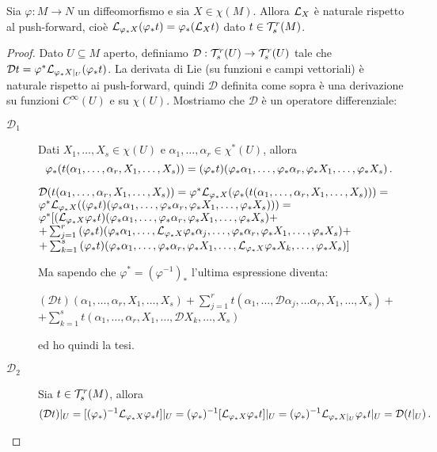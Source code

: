 \begin{proposition}
	Sia $\varphi: M \to N$ un diffeomorfismo e sia $X\in\chi(M)$. Allora $\mathcal L_X$ è naturale rispetto al push-forward, cioè $\mathcal L_{\varphi_*X} (\varphi_*t) = \varphi_*(\mathcal L_Xt)$ dato $t\in\mathcal T_s^r(M)$.
\end{proposition}
\begin{proof}
	Dato $U\subseteq M$ aperto, definiamo $\mathcal D: \mathcal T_s^r(U) \to \mathcal T_s^r(U)$ tale che $\mathcal Dt = \varphi^*\mathcal L_{\varphi_*X|_ U}(\varphi_*t)$.
	La derivata di Lie (su funzioni e campi vettoriali) è naturale rispetto ai push-forward, quindi $\mathcal D$ definita come sopra è una derivazione su funzioni $C^\infty(U)$ e su $\chi(U)$.
	Mostriamo che $\mathcal D$ è un operatore differenziale:
	\begin{description}
	 \item [$\mathcal D_1$]

	Dati $X_1,\ldots,X_s\in\chi(U)$ e $\alpha_1,\ldots,\alpha_r\in\chi^*(U)$, allora
	\begin{equation*}
	\varphi_*(t(\alpha_1,\ldots,\alpha_r,X_1,\ldots,X_s) )= (\varphi_*t)(\varphi_*\alpha_1,\ldots,\varphi_*\alpha_r,\varphi_*X_1,\ldots,\varphi_*X_s)\, \text{. }
	\end{equation*}
	
	  $  \mathcal D(t(\alpha_1,\ldots,\alpha_r,X_1,\ldots,X_s)) = \varphi^*\mathcal L_{\varphi_*X}(\varphi_*(t(\alpha_1,\ldots,\alpha_r,X_1,\ldots,X_s))) = $
	  $  \varphi^*\mathcal L_{\varphi_*X}((\varphi_*t)(\varphi_*\alpha_1,\ldots,\varphi_*\alpha_r,\varphi_*X_1,\ldots,\varphi_*X_s))) = $ \\
	  $  \varphi^*[(\mathcal L_{\varphi_*X}\varphi_*t)(\varphi_*\alpha_1,\ldots,\varphi_*\alpha_r,\varphi_*X_1,\ldots,\varphi_*X_s) + $ \\
	  $  +\sum_{j=1}^r{(\varphi_*t)(\varphi_*\alpha_1,\ldots,\mathcal L_{\varphi_*X}\varphi_*\alpha_j,\ldots,\varphi_*\alpha_r,\varphi_*X_1,\ldots,\varphi_*X_s)} +$ \\
	  $  +\sum_{k=1}^s{(\varphi_*t)(\varphi_*\alpha_1,\ldots,\varphi_*\alpha_r,\varphi_*X_1,\ldots,\mathcal L_{\varphi_*X}\varphi_*X_k,\ldots,\varphi_*X_s)}] $
	
	Ma sapendo che $\varphi^*=(\varphi^{-1})_*$ l'ultima espressione diventa:
	
	  $ (\mathcal D t)(\alpha_1,\ldots,\alpha_r,X_1,\ldots,X_s)+\sum_{j=1}^r{t(\alpha_1,\ldots,\mathcal D \alpha_j, \ldots \alpha_r,X_1,\ldots,X_s)} +$\\
	  $ +\sum_{k=1}^s{t(\alpha_1,\ldots, \alpha_r,X_1,\ldots,\mathcal D X_k, \ldots,X_s)}$
	 
	 ed ho quindi la tesi.
	
	\item [$\mathcal D_2$]
		Sia $t\in\mathcal T_s^r(M)$, allora
		\begin{equation*}
			(\mathcal Dt)|_ U = [(\varphi_*)^{-1} \mathcal L_{\varphi_*X}\varphi_*t]|_ U 
			= (\varphi_*)^{-1}[\mathcal L_{\varphi_*X}\varphi_*t]|_ U 
			= (\varphi_*)^{-1} \mathcal L_{\varphi_*X|_ U}\varphi_*t |_ U = \mathcal D(t|_ U) \, \text{. }
		\end{equation*}
	\end{description}
\end{proof}

